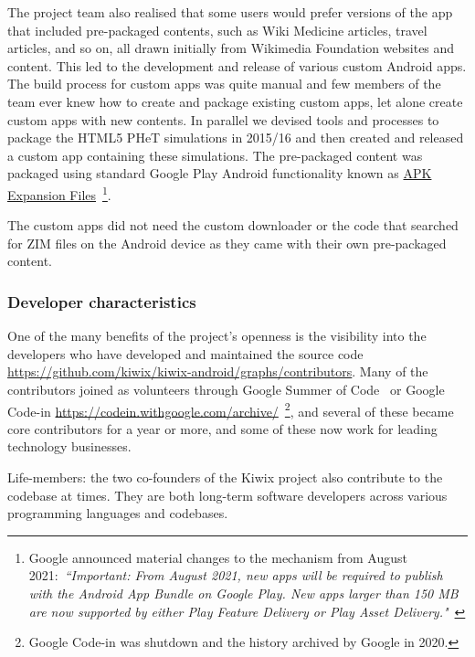 The project team also realised that some users would prefer versions of the app that included pre-packaged contents, such as Wiki Medicine articles, travel articles, and so on, all drawn initially from Wikimedia Foundation websites and content. This led to the development and release of various custom Android apps. The build process for custom apps was quite manual and few members of the team ever knew how to create and package existing custom apps, let alone create custom apps with new contents.  In parallel we devised tools and processes to package the HTML5 PHeT simulations in 2015/16 and then created and released a custom app containing these simulations. The pre-packaged content was packaged using standard Google Play Android functionality known as \href{https://developer.android.com/google/play/expansion-files}{APK Expansion Files}~\footnote{Google announced material changes to the mechanism from August 2021:~\emph{``Important: From August 2021, new apps will be required to publish with the Android App Bundle on Google Play. New apps larger than 150 MB are now supported by either Play Feature Delivery or Play Asset Delivery."}~\citep{apk_expansion_files}}. %

The custom apps did not need the custom downloader or the code that searched for ZIM files on the Android device as they came with their own pre-packaged content.


\subsubsection{Developer characteristics}
One of the many benefits of the project’s openness is the visibility into the developers who have developed and maintained the source code \url{https://github.com/kiwix/kiwix-android/graphs/contributors}. Many of the contributors joined as volunteers through Google Summer of Code~\citep{google_summer_of_code} or Google Code-in \url{https://codein.withgoogle.com/archive/}~\footnote{Google Code-in was shutdown and the history archived by Google in 2020.}, and several of these became core contributors for a year or more, and some of these now work for leading technology businesses. 

Life-members: the two co-founders of the Kiwix project also contribute to the codebase at times. They are both long-term software developers across various programming languages and codebases.

